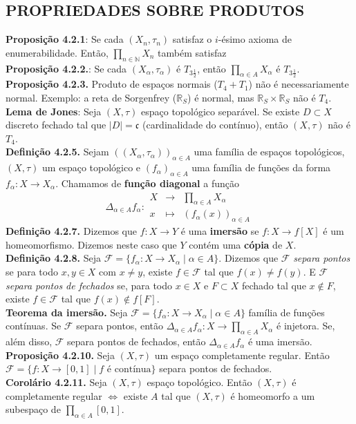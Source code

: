 \documentclass{article}
\begin{document}
\begin{landscape}
\begin{multicols}{3}
\subsection{PROPRIEDADES SOBRE PRODUTOS}
\textbf{Proposição 4.2.1}: Se cada $(X_n, \tau_n)$ satisfaz o $i$-ésimo axioma de enumerabilidade. Então, $\prod_{n \in \mathbb{N}} X_n$ também satisfaz\\
\textbf{Proposição 4.2.2.}: Se cada $(X_\alpha, \tau_\alpha)$ é $T_{3\frac{1}{2}}$, então $\prod_{\alpha \in A} X_\alpha$ é $T_{3\frac{1}{2}}$.\\
\textbf{Proposição 4.2.3.} Produto de espaços normais ($T_{4} + T_{1}$) não é necessariamente normal. Exemplo: a reta de Sorgenfrey ($\mathbb{R}_{S}$) é normal, mas $\mathbb{R}_{S} \times \mathbb{R}_{S}$ não é $T_{4}$. \\
\textbf{Lema de Jones}: Seja $(X, \tau)$ espaço topológico separável. Se existe $D \subset X$ discreto fechado tal que $|D| = \mathfrak{c}$ (cardinalidade do contínuo), então $(X, \tau)$ não é $T_4$.\\
\textbf{Definição 4.2.5.} Sejam $((X_\alpha, \tau_\alpha))_{\alpha \in A}$ uma família de espaços topológicos, $(X, \tau)$ um espaço topológico e $(f_\alpha)_{\alpha \in A}$ uma família de funções da forma $f_\alpha : X \to X_\alpha$. Chamamos de \textbf{função diagonal} a função
\[
\Delta_{\alpha \in A} f_\alpha : 
\begin{array}{ccc}
X & \to & \prod_{\alpha \in A} X_\alpha \\
x & \mapsto & (f_\alpha(x))_{\alpha \in A}
\end{array}
\]
\textbf{Definição 4.2.7.} Dizemos que $f : X \to Y$ é uma \textbf{imersão} se $f : X \to f[X]$ é um homeomorfismo. Dizemos neste caso que $Y$ contém uma \textbf{cópia} de $X$.\\
\textbf{Definição 4.2.8.} Seja $\mathcal{F} = \{f_\alpha : X \to X_\alpha \mid \alpha \in A\}$. Dizemos que $\mathcal{F}$ \textit{separa pontos} se para todo $x, y \in X$  com $x\not = y$, existe $f \in \mathcal{F}$ tal que $f(x) \neq f(y)$. E $\mathcal{F}$ \textit{separa pontos de fechados} se, para todo $x \in X$ e $F \subset X$ fechado tal que $x \notin F$, existe $f \in \mathcal{F}$ tal que $f(x) \notin f[F]$.\\
\textbf{Teorema da imersão.} Seja $\mathcal{F} = \{f_\alpha : X \to X_\alpha \mid \alpha \in A\}$ família de funções contínuas. Se $\mathcal{F}$ separa pontos, então $\Delta_{\alpha \in A} f_\alpha : X \to \prod_{\alpha \in A} X_\alpha$ é injetora. Se, além disso, $\mathcal{F}$ separa pontos de fechados, então $\Delta_{\alpha \in A} f_\alpha$ é uma imersão.\\
\textbf{Proposição 4.2.10.} Seja $(X, \tau)$ um espaço completamente regular. Então $\mathcal{F} = \{f : X \to [0,1] \mid f \text{ é contínua}\}$ separa pontos de fechados.\\
\textbf{Corolário 4.2.11.} Seja $(X, \tau)$ espaço topológico. Então $(X, \tau)$ é completamente regular $\Leftrightarrow$ existe $A$ tal que $(X, \tau)$ é homeomorfo a um subespaço de $\prod_{\alpha \in A} [0,1]$.


\end{multicols}
\end{landscape}
\end{document}
